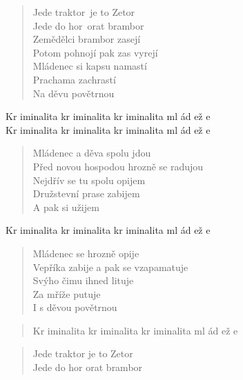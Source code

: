 \begin{song}{}
\begin{verse}
   Jede traktor~je to Zetor \\
   Jede do hor~orat brambor \\
   Zemědělci brambor zasejí \\
   Potom pohnojí pak zas vyrejí \\
   Mládenec si kapsu namastí \\
   Prachama zachrastí \\
   Na děvu povětrnou
\end{verse}
\begin{refren}
   Kr iminalita kr iminalita kr iminalita ml ád ež e \\
   Kr iminalita kr iminalita kr iminalita ml ád ež e 
\end{refren}
\begin{verse}
Mládenec a děva spolu jdou \\
   Před novou hospodou hrozně se radujou \\
   Nejdřív se tu spolu opijem \\
   Družstevní prase zabijem \\
   A pak si užijem
\end{verse}
  \begin{chords}
    \chordpowerE \chordpowerG \chordpowerA \chordpowerD
  \end{chords}
\begin{refren}
   Kr iminalita kr iminalita kr iminalita ml ád ež e 
\end{refren}
\begin{verse}
  Mládenec se hrozně opije \\
   Vepříka zabije a pak se vzapamatuje \\
   Svýho čimu ihned lituje \\
   Za mříže putuje \\
   I s děvou povětrnou
\end{verse}
\begin{verse}
   Kr iminalita kr iminalita kr iminalita ml ád ež e 
\end{verse}
\begin{verse}
   Jede traktor je to Zetor \\
   Jede do hor orat brambor
\end{verse}
\end{song}
\pagebreak
